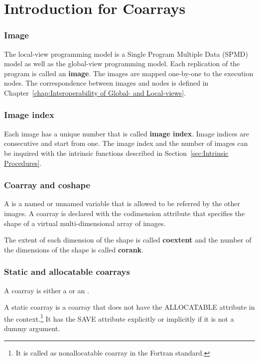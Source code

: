 \section{Introduction for Coarrays}
\label{sec:Introduction for Coarrays}

\subsubsection*{Image}
The local-view programming model is a Single Program Multiple Data 
(SPMD) model as well as the global-view programming model.
Each replication of the program is called an {\bf image}.
The images are mapped one-by-one to the execution nodes.
The correspondence between images and nodes is defined in 
Chapter~\ref{chap:Interoperability of Global- and Local-views}.

\subsubsection*{Image index}
Each image has a unique number that is called {\bf image index}. 
Image indices are consecutive and start from one.
The image index and the number of images can be inquired with the intrinsic
functions described in Section~\ref{sec:Intrinsic Procedures}.

\subsubsection*{Coarray and coshape}
A  is a named or unnamed variable that is allowed to be referred 
by the other images. 
A coarray is declared with the codimension attribute
that specifies the shape of a virtual multi-dimensional array of images.

{\onlyC}

The extent of each dimension of the shape is called {\bf coextent} and
the number of the dimensions of the shape is called {\bf corank}.

\subsubsection*{Static and allocatable coarrays}
A coarray is either a  or an .

{\onlyF} 
A static coarray is a coarray that does not have the ALLOCATABLE attribute
in the context.\footnote
{It is called as nonallocatable coarray in the Fortran standard.}
It has the SAVE attribute explicitly or implicitly if it is not a dummy argument.

